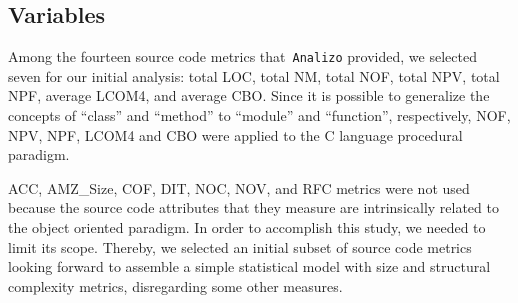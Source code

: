 \documentclass[conference]{IEEEtran}
\newcommand{\TODO}[1]{{\color{red}\textbf{\uwave{#1}}}}
\begin{document}
\subsection{Variables}
\label{variables}

Among the fourteen source code metrics that~\texttt{Analizo} provided, 
we selected seven for our initial analysis: 
%
total LOC, total NM, total NOF, total NPV, total NPF, average LCOM4,
and average CBO.
%
Since it is possible to generalize the concepts of ``class'' and ``method''
to ``module'' and ``function'', respectively, NOF, NPV, NPF, LCOM4 and CBO 
were applied to the C language procedural paradigm. 

ACC, AMZ\_Size, COF, DIT, NOC, NOV, and RFC metrics were not used 
because the source code attributes that they measure are intrinsically related to the 
object oriented paradigm.
%
In order to accomplish this study, we needed to limit its scope. Thereby, we selected an initial 
subset of source code metrics looking forward to assemble a simple
statistical model with size and structural complexity metrics, disregarding some other measures.
%
\end{document}
